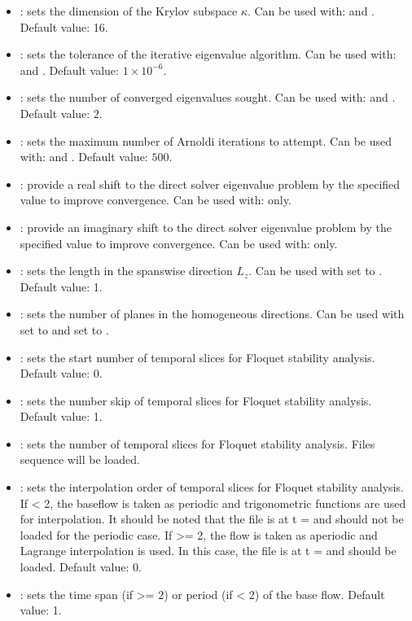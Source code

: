 \begin{itemize}
\item {}: sets the dimension of the Krylov subspace $\kappa$. Can be used with:  and . Default value: 16.
\item {}: sets the tolerance of the iterative eigenvalue algorithm. Can be used with:  and . Default value: $1\times10^{-6}$.
\item {}: sets the number of converged eigenvalues sought. Can be used with:  and . Default value: $2$.
\item {}: sets the maximum number of Arnoldi iterations to attempt. Can be used with:  and . Default value: $500$.
\item {}: provide a real shift to the direct solver eigenvalue problem by the specified value to improve convergence. Can be used with:  only.
\item {}: provide an imaginary shift to the direct solver eigenvalue problem by the specified value to improve convergence. Can be used with:  only.
\item {}:  sets the length in the spanswise direction $L_z$. Can be used with  set to . Default value: 1.
\item {}: sets the number of planes in the homogeneous directions. Can be used with  set to  and  set to .
\item {}: sets the start number of temporal slices for Floquet stability analysis. Default value: 0.
\item {}: sets the number skip of temporal slices for Floquet stability analysis. Default value: 1.
\item {}: sets the number of temporal slices for Floquet stability analysis. Files sequence  will be loaded.
\item {}: sets the interpolation order of temporal slices for Floquet stability analysis. If  < 2, the baseflow is taken as periodic and trigonometric functions are used for interpolation. It should be noted that the file  is at t =  and should not be loaded for the periodic case. If  >= 2, the flow is taken as aperiodic and Lagrange interpolation is used. In this case, the file  is at  t =  and should be loaded. Default value: 0.
\item {}: sets the time span (if  >= 2) or period (if  < 2) of the base flow. Default value: 1.
\end{itemize}

